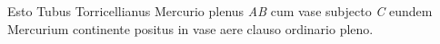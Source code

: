              \startlock    [103~r\textsuperscript{o}]  Esto Tubus Torricellianus Mercurio plenus \textit{AB} cum vase subjecto \textit{C} eundem Mercurium  continente positus in vase aere clauso ordinario  pleno.
